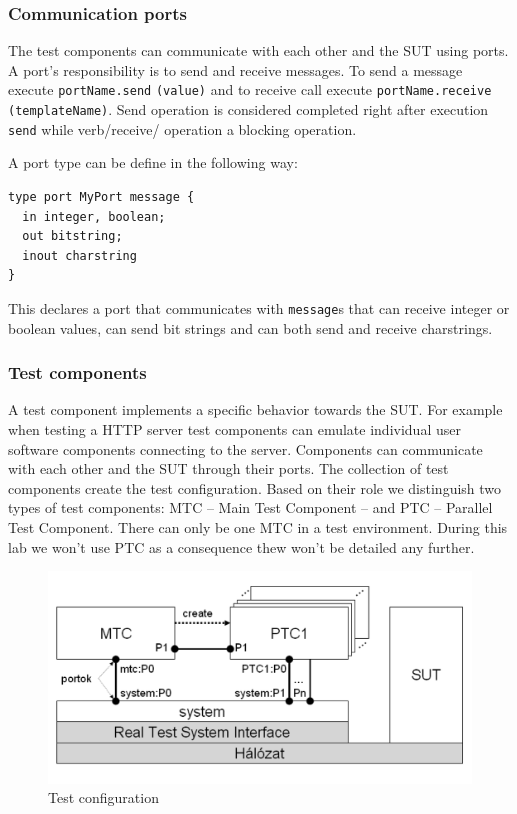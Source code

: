 \documentclass[a4paper]{article}
\begin{document}
\subsubsection{Communication ports}

The test components can communicate with each other and the SUT using ports. A port's responsibility is to send and
receive messages. To send a message execute \verb/portName.send/ \verb/(value)/ and to receive
call execute \verb/portName.receive/ \verb/(templateName)/. Send operation is considered completed right
after execution \verb/send/ while verb/receive/ operation a blocking operation.

A port type can be define in the following way:
{\footnotesize
\begin{lstlisting}
type port MyPort message {
  in integer, boolean;
  out bitstring;
  inout charstring
}
\end{lstlisting}
}

This declares a port that communicates with \verb/message/s that can receive integer or boolean values,
can send bit strings and can both send and receive charstrings.

\subsubsection{Test components}
A test component implements a specific behavior towards the SUT. For example when testing a HTTP server test components
can emulate individual user software components connecting to the server.
Components can communicate with each other and the SUT through their ports. The collection of test components create
the test configuration. Based on their role we distinguish two types of test components: MTC -- Main Test Component --
and PTC -- Parallel Test Component. There can only be one MTC in a test environment. During this lab we won't use PTC
as a consequence thew won't be detailed any further.

\begin{figure}[H]
    \centering
    \includegraphics[width=\textwidth]{figures/TC.png}
    \caption{Test configuration}
    \label{fig:tc}
\end{figure}
\end{document}
